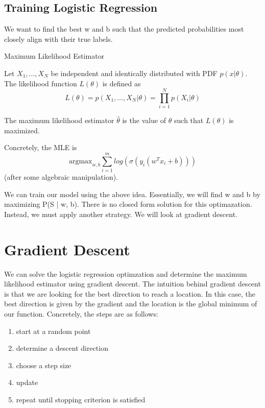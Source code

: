 \subsection*{Training Logistic Regression}
We want to find the best w and b such that the predicted probabilities most closely align with their true labels.

\begin{definition}
    Maximum Likelihood Estimator

    Let $X_1, ..., X_N$ be independent and identically distributed with PDF $p(x|\theta)$. The likelihood function $L(\theta)$ is defined as 
    \[
        L(\theta) = p(X_1, ..., X_N | \theta) = \prod_{i=1}^{N}p(X_i | \theta)
    \]

    The maximum likelihood estimator $\hat{\theta}$ is the value of $\theta$ such that $L(\theta)$ is maximized.

    Concretely, the MLE is 
    $$  \text{argmax}_{w, b} \sum_{i=1}^{m}log(\sigma(y_i(w^Tx_i + b)))$$ (after some algebraic manipulation).
\end{definition}

We can train our model using the above idea. Essentially, we will find w and b by maximizing P(S | w, b). There is no closed form solution for this optimazation. Instead, we must apply another strategy. We will look at gradient descent.

\section{Gradient Descent}
\begin{center}
\end{center}
We can solve the logistic regression optimzation and determine the maximum likelihood estimator using gradient descent. The intuition behind gradient descent is that we are looking for the best direction to reach a location. In this case, the best direction is given by the gradient and the location is the global minimum of our function. Concretely, the steps are as follows:
\begin{enumerate}
    \item start at a random point
    \item determine a descent direction
    \item choose a step size
    \item update
    \item repeat until stopping criterion is satisfied
\end{enumerate}


